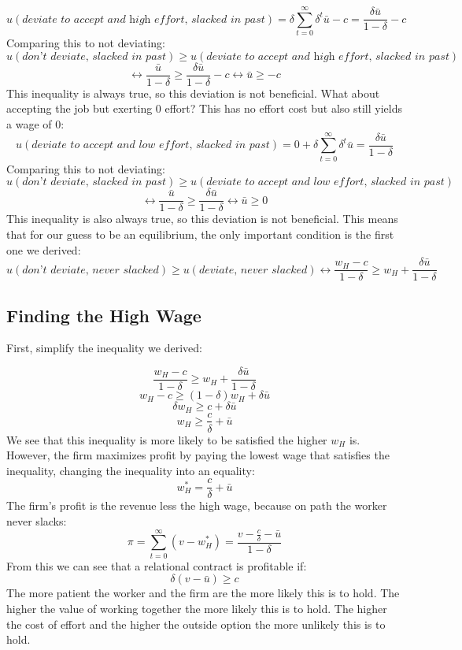 \documentclass{article}
\begin{document}
 \[u(\textit{deviate to accept and high effort, slacked in past}) =  \delta \sum_{t=0}^\infty \delta^t \bar u-c=   \frac{\delta \bar u}{1-\delta}-c\]
 Comparing this to not deviating:
 \[u(\textit{don't deviate, slacked in past})  \geq u(\textit{deviate to accept and high effort, slacked in past}) \]
 \[\leftrightarrow \frac{\bar u}{1-\delta} \geq \frac{\delta \bar u}{1-\delta}-c \leftrightarrow  \bar u \geq-c \]
This inequality is always true, so this deviation is not beneficial. What about accepting the job but exerting 0 effort? This has no effort cost but also still yields a wage of 0:
 \[u(\textit{deviate to accept and low effort, slacked in past}) =  0+\delta \sum_{t=0}^\infty \delta^t \bar u=   \frac{\delta \bar u}{1-\delta}\]
  Comparing this to not deviating:
   \[u(\textit{don't deviate, slacked in past})  \geq u(\textit{deviate to accept and low effort, slacked in past}) \]
   \[\leftrightarrow \frac{\bar u}{1-\delta} \geq \frac{\delta \bar u}{1-\delta} \leftrightarrow  \bar u \geq 0 \]
 This inequality is also always true, so this deviation is not beneficial. This means that for our guess to be an equilibrium, the only important condition is the first one we derived:
\[u(\textit{don't deviate, never slacked}) \geq u(\textit{deviate, never slacked}) \leftrightarrow \frac{w_H-c}{1-\delta}\geq w_H+ \frac{\delta \bar u}{1-\delta}\]

\subsection{Finding the High Wage}


First, simplify the inequality we derived:

\[\frac{w_H-c}{1-\delta}\geq w_H+ \frac{\delta \bar u}{1-\delta}\]
\[w_H-c \geq (1-\delta) w_H +\delta \bar u\]
\[\delta w_H \geq c +\delta \bar u\]
\[w_H \geq   \frac{c}{\delta}+\bar u\]
We see that this inequality is more likely to be satisfied the higher $w_H$ is. However, the firm maximizes profit by paying the lowest wage that satisfies the inequality, changing the inequality into an equality:
\[w_H^*=\frac{c}{\delta}+\bar u\]
The firm's profit is the revenue less the high wage, because on path the worker never slacks:
\[\pi = \sum_{t=0}^\infty (v-w_H^*)=\frac{v-\frac{c}{\delta}-\bar u}{1-\delta}\]
From this we can see that a relational contract is profitable if:
\[\delta(v-\bar u) \geq c\]
The more patient the worker and the firm are the more likely this is to hold. The higher the value of working together the more likely this is to hold. The higher the cost of effort and the higher the outside option the more unlikely this is to hold.
\end{document}
